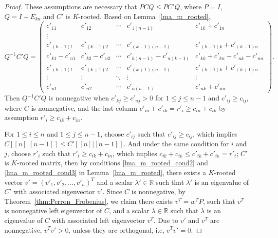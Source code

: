 \documentclass[12pt, a4paper]{article}
\theoremstyle{plain}
\theoremstyle{definition}
\begin{document}
\begin{proof}
    These assumptions are necessary that $PCQ \leq PC'Q$, where $P=I$, $Q=I+E_{kn}$ and $C'$ is $K$-rooted. Based on Lemma~\ref{lma_m_rooted},
    $$Q^{-1}C'Q=
        \begin{pmatrix}
        c'_{11}     & c'_{12} & \cdots     & c'_{1 (n-1)} & c'_{1k}+c'_{1n} \\
        \vdots \\
        c'_{(k-1)1}     & c'_{(k-1) 2}           & \cdots     & c'_{(k-1) (n-1)} & c'_{(k-1)k}+c'_{(k-1)n} \\
        c'_{k1}-c'_{n1} & c'_{k2}-c'_{n2} &\cdots      &c'_{k(n-1)}-c'_{n(k-1)}& c'_{kk}+c'_{kn}-c'_{nk}-c'_{nn}\\
        c'_{(k+1)1}     & c'_{(k+1)2}           & \cdots     & c'_{(k+1) (n-1)} & c'_{(k+1)k}+c'_{(k+1)n} \\
        \vdots              & \vdots & \ddots              & \vdots & \vdots \\
        c'_{n1}             & c'_{n2} & \cdots             & c'_{n (n-1)} & c'_{nk}+c'_{nn}
    \end{pmatrix}.$$
    Then $Q^{-1}C'Q$ is nonnegative when $c'_{kj}\geq c'_{nj}>0$ for $1\leq j\leq n-1$ and $c'_{ij}\geq c_{ij}$, where $C$ is nonnegative,
     and the last column $c'_{in}+c'_{ik}=r'_i \geq c_{in}+c_{ik}$ by assumption $r'_i\geq c_{ik}+c_{in}$.

    For $1\leq i \leq n$ and $1\leq j\leq n-1$, choose $c'_{ij}$ such that $c'_{ij}\geq c_{ij}$,
    which implies $C[[n]|[n-1]]\leq C'[[n]|[n-1]]$.
    And under the same condition for $i$ and $j$, choose $r'_i$ such that $r'_i\geq c_{ik}+c_{in}$,
    which implies $c_{ik}+c_{in}\leq c'_{ik}+c'_{in} = r'_i$;
    $C'$ is $K$-rooted matrix, then by conditions \ref{lma_m_rooted_cond2} and \ref{lma_m_rooted_cond3} in Lemma~\ref{lma_m_rooted}, there exists a $K$-rooted vector $v'=(v'_1, v'_2, \ldots, v'_n)^T$ and a scalar $\lambda'\in \mathbb{R}$
    such that $\lambda'$ is an eigenvalue of $C'$ with associated eigenvector $v'$.
    Since $C$ is nonnegative, by Theorem~\ref{thm:Perron_Frobenius}, we claim there exists
    $v^T = w^{T}P$, such that $v^T$ is nonnegative left eigenvector of $C$, and a scalar $\lambda\in \mathbb{R}$ such that $\lambda$
    is an eigenvalue of $C$ with associated left eigenvector $v^T$.
    Due to $v'$ and $v^T$ are nonnegative, $v^Tv'>0$, unless they are orthogonal, i.e, $v^Tv'=0$.


\end{proof}
\end{document}

